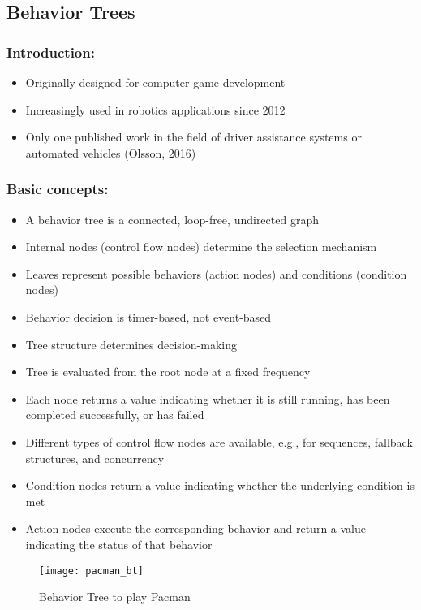 \subsection{Behavior Trees}

\subsubsection*{Introduction:}
\begin{itemize}
    \item Originally designed for computer game development
    \item Increasingly used in robotics applications since 2012
    \item Only one published work in the field of driver assistance systems or automated vehicles (Olsson, 2016)
\end{itemize}

\subsubsection*{Basic concepts:}
\begin{itemize}
    \item A behavior tree is a connected, loop-free, undirected graph
    \item Internal nodes (control flow nodes) determine the selection mechanism
    \item Leaves represent possible behaviors (action nodes) and conditions (condition nodes)
    \item Behavior decision is timer-based, not event-based
    \item Tree structure determines decision-making
    \item Tree is evaluated from the root node at a fixed frequency
    \item Each node returns a value indicating whether it is still running, has been completed successfully, or has failed
    \item Different types of control flow nodes are available, e.g., for sequences, fallback structures, and concurrency
    \item Condition nodes return a value indicating whether the underlying condition is met
    \item Action nodes execute the corresponding behavior and return a value indicating the status of that behavior
\end{itemize}


\begin{figure}
  \centering
  \texttt{[image: pacman\_bt]}

  \caption{Behavior Tree to play Pacman}%
  \label{fig:pacman_bt}
\end{figure}

